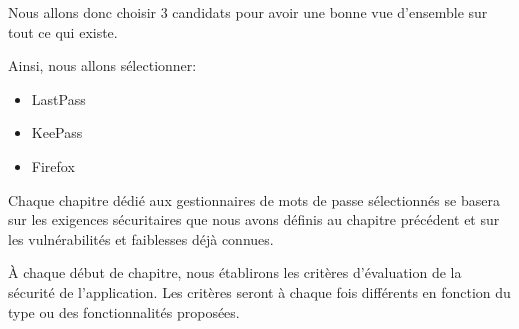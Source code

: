 Nous allons donc choisir 3 candidats pour avoir une bonne vue d'ensemble sur tout ce qui existe.

Ainsi, nous allons sélectionner:
\begin{itemize}
	\item LastPass
	\item KeePass
	\item Firefox
\end{itemize}

Chaque chapitre dédié aux gestionnaires de mots de passe sélectionnés se basera sur les exigences sécuritaires que nous avons définis au chapitre précédent et sur les vulnérabilités et faiblesses déjà connues. 

À chaque début de chapitre, nous établirons les critères d'évaluation de la sécurité de l'application. Les critères seront à chaque fois différents en fonction du type ou des fonctionnalités proposées. 


